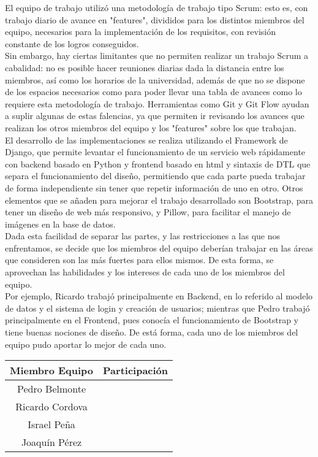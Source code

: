 El equipo de trabajo utilizó una metodología de trabajo tipo Scrum: esto es, con trabajo diario de avance en "features", divididos para los distintos miembros del equipo, necesarios para la implementación de los requisitos, con revisión constante de los logros conseguidos. \\
Sin embargo, hay ciertas limitantes que no permiten realizar un trabajo Scrum a cabalidad: no es posible hacer reuniones diarias dada la distancia entre los miembros, así como los horarios de la universidad, además de que no se dispone de los espacios necesarios como para poder llevar una tabla de avances como lo requiere esta metodología de trabajo. Herramientas como Git y Git Flow ayudan a suplir algunas de estas falencias, ya que permiten ir revisando los avances que realizan los otros miembros del equipo y los "features" sobre los que trabajan.\\
El desarrollo de las implementaciones se realiza utilizando el Framework de Django, que permite levantar el funcionamiento de un servicio web rápidamente con backend basado en Python y frontend basado en html y sintaxis de DTL que separa el funcionamiento del diseño, permitiendo que cada parte pueda trabajar de forma independiente sin tener que repetir información de uno en otro. Otros elementos que se añaden para mejorar el trabajo desarrollado son Bootstrap, para tener un diseño de web más responsivo, y Pillow, para facilitar el manejo de imágenes en la base de datos. \\
Dada esta facilidad de separar las partes, y las restricciones a las que nos enfrentamos, se decide que los miembros del equipo deberían trabajar en las áreas que consideren son las más fuertes para ellos mismos. De esta forma, se aprovechan las habilidades y los intereses de cada uno de los miembros del equipo. \\
Por ejemplo, Ricardo trabajó principalmente en Backend, en lo referido al modelo de datos y el sistema de login y creación de usuarios; mientras que Pedro trabajó principalmente en el Frontend, pues conocía el funcionamiento de Bootstrap y tiene buenas nociones de diseño. De está forma, cada uno de los miembros del equipo pudo aportar lo mejor de cada uno. \\


\begin{table}[H]
  \centering
	\begin{tabular}{|c|c|}
	\hline 
	Miembro Equipo & Participación \\ 
	\hline 
	Pedro Belmonte & 
	\tabitem 
	\tabitem
	\tabitem 
	\tabitem
	\\ 
	\hline 
	Ricardo Cordova & 
	\tabitem  
	\tabitem 
	\tabitem 
	\tabitem 
	\\ 
 	\hline 
	Israel Peña & 
	\tabitem 
	\tabitem 
	\tabitem 
	\tabitem 
	\\ 
	\hline 
	Joaquín Pérez &
	\tabitem 
	\tabitem 
	\tabitem 
	\\ 
	\hline 
	\end{tabular} 
\end{table}

